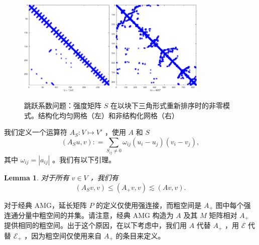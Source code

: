 \documentclass[12pt]{acta_2011xz}
\newtheorem{lemma}[theorem]{Lemma}
\begin{document}
   \begin{figure}[!ht]
\centering
{\includegraphics*[width=0.4\textwidth]{jump3reg}}\hspace*{0.1\textwidth}
{\includegraphics*[width=0.4\textwidth]{jump3u}}
\caption{跳跃系数问题：强度矩阵    $S$    在以块下三角形式重新排序时的非零模式。结构化均匀网格（左）和非结构化网格（右）   \label{fig:jump3}     }
\end{figure}    我们定义一个运算符    $A_S: V\mapsto V'$   ，使用    $A$    和    $S$    
   \begin{equation*}
    (A_S u, v): = \sum_{S_{ij}\neq 0} \omega_{ij}(u_i -u_j)(v_i-v_j),
\end{equation*}    其中    $\omega_{ij}=|a_{ij}|$    。我们有以下引理。
   \begin{lemma}对于所有    $v\in V$    ，我们有
   $$(A_Sv, v)\le (A_+v, v) \lesssim (Av, v).$$     \end{lemma}     

对于经典 AMG，延长矩阵    $P$    的定义仅使用强连接，而粗空间是
   $A_+$    图中每个强连通分量中粗空间的并集。请注意，经典 AMG 构造为    $A$    及其    $M$    矩阵相对    $A_+$    提供相同的粗空间。出于这个原因，在以下考虑中，我们用    $A$    代替
   $A_+$    ，用    $\mathcal{E}$    代替    $\mathcal{E}_+$    ，因为粗空间仅使用来自    $A_+$    的条目来定义。  
\end{document}
